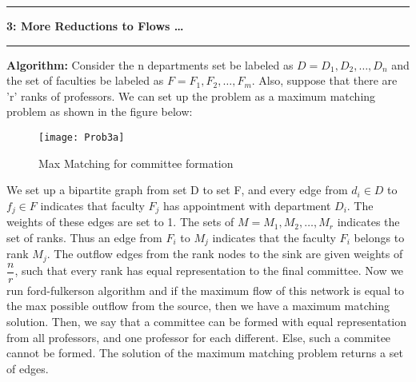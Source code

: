 \documentclass{article}
\newcommand\question[2]{\vspace{.25in}\hrule\textbf{#1: #2}\hrule\vspace{.10in}}
\newcommand\algo{\vspace{.10in}\textbf{Algorithm: }}
\begin{document}
   \question{3}{More Reductions to Flows \dots}
   \algo Consider the n departments set be labeled as $D={D_1, D_2, \dots, D_n}$ and the set of faculties be labeled as $F = {F_1, F_2, \dots , F_m}$. Also, suppose that there are 'r' ranks of professors. We can set up the problem as a maximum matching problem as shown in the figure below: \newline
  \begin{figure}[H]
   \centering
  \texttt{[image: Prob3a]}
  \caption{Max Matching for committee formation}
  \end{figure}
  We set up a bipartite graph from set D to set F, and every edge from $d_i \in D$ to $f_j \in F$ indicates that faculty $F_j$ has appointment with department $D_i$. The weights of these edges are set to 1. The sets of $M={M_1, M_2, \dots , M_r}$ indicates the set of ranks. Thus an edge from $F_i$ to $M_j$ indicates that the faculty $F_i$ belongs to rank $M_j$. The outflow edges from the rank nodes to the sink are given weights of $\dfrac{n}{r}$, such that every rank has equal representation to the final committee. Now we run ford-fulkerson algorithm and if the maximum flow of this network is equal to the max possible outflow from the source, then we have a maximum matching solution. Then, we say that a committee can be formed with equal representation from all professors, and one professor for each different. Else, such a commitee cannot be formed. The solution of the maximum matching problem returns a set of edges. 
   
 
\end{document}
